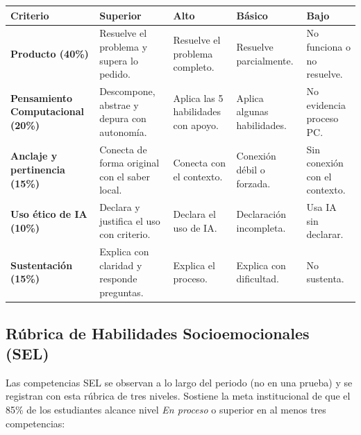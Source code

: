 \documentclass[12pt, a4paper]{article}
\begin{document}
\begin{center}
\scriptsize
\setlength{\tabcolsep}{3pt}
\begin{tabular}{|L{2.7cm}|L{2.7cm}|L{2.7cm}|L{2.7cm}|L{2.4cm}|}
\hline
{}
\color{white}\textbf{Criterio} &
\color{white}\textbf{Superior} &
\color{white}\textbf{Alto} &
\color{white}\textbf{Básico} &
\color{white}\textbf{Bajo} \\
\hline
\textbf{Producto (40\%)} & Resuelve el problema y supera lo pedido. & Resuelve el problema completo. & Resuelve parcialmente. & No funciona o no resuelve. \\
\hline
\textbf{Pensamiento Computacional (20\%)} & Descompone, abstrae y depura con autonomía. & Aplica las 5 habilidades con apoyo. & Aplica algunas habilidades. & No evidencia proceso PC. \\
\hline
\textbf{Anclaje y pertinencia (15\%)} & Conecta de forma original con el saber local. & Conecta con el contexto. & Conexión débil o forzada. & Sin conexión con el contexto. \\
\hline
\textbf{Uso ético de IA (10\%)} & Declara y justifica el uso con criterio. & Declara el uso de IA. & Declaración incompleta. & Usa IA sin declarar. \\
\hline
\textbf{Sustentación (15\%)} & Explica con claridad y responde preguntas. & Explica el proceso. & Explica con dificultad. & No sustenta. \\
\hline
\end{tabular}
\end{center}

\subsection{Rúbrica de Habilidades Socioemocionales (SEL)}

Las competencias SEL se observan a lo largo del periodo (no en una prueba) y se
registran con esta rúbrica de tres niveles. Sostiene la meta institucional de que
el 85\% de los estudiantes alcance nivel \textit{En proceso} o superior en al
menos tres competencias:
\end{document}
